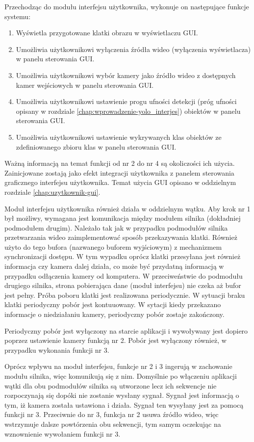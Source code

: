 Przechodząc do modułu interfejsu użytkownika, wykonuje on następujące funkcje systemu:
\begin{enumerate}
    \item Wyświetla przygotowane klatki obrazu w wyświetlaczu GUI.
    \item Umożliwia użytkownikowi wyłączenia źródła wideo (wyłączenia wyświetlacza) w panelu sterowania GUI.
    \item Umożliwia użytkownikowi wybór kamery jako źródło wideo z dostępnych kamer wejściowych w panelu sterowania GUI.
    \item Umożliwia użytkownikowi ustawienie progu ufności detekcji (próg ufności opisany w rozdziale \ref{chap:wprowadzenie-yolo_interjes}) obiektów w panelu sterowania GUI.
    \item Umożliwia użytkownikowi ustawienie wykrywanych klas obiektów ze zdefiniowanego zbioru klas w panelu sterowania GUI.
\end{enumerate}
Ważną informacją na temat funkcji od nr 2 do nr 4 są okoliczości ich użycia. Zainicjowane zostają jako efekt integracji użytkownika z panelem sterowania graficznego interfejsu użytkownika. Temat użycia GUI opisano w oddzielnym rozdziale \ref{chap:uzytkownik-gui}. 

Moduł interfejsu użytkownika również działa w oddzielnym wątku. Aby krok nr 1 był możliwy, wymagana jest komunikacja między modułem silnika (dokładniej podmodułem drugim).  
Należało tak jak w przypadku podmodułów silnika przetwarzania wideo zaimplementować sposób przekazywania klatki. Również użyto do tego bufora (nazwanego buforem wyjściowym) z mechanizmem synchronizacji dostępu. W tym wypadku oprócz klatki przesyłana jest również informacja czy kamera dalej działa, co może być przydatną informacją w przypadku odłączenia kamery od komputera. W przeciweństwie do podmodułu drugiego silnika, strona pobierająca dane (moduł interfejsu) nie czeka aż bufor jest pełny. Próba poboru klatki jest realizowana periodycznie. W sytuacji braku klatki periodyczny pobór jest kontuuowany. W sytacji kiedy przekazano informacje o niedziałaniu kamery, periodyczny pobór zostaje zakończony.

Periodyczny pobór jest wyłączony na starcie aplikacji i wywoływany jest dopiero poprzez ustawienie kamery funkcją nr 2. Pobór jest wyłączony również, w przypadku wykonania funkcji nr 3.

Oprócz wpływu na moduł interfejsu, funkcje nr 2 i 3 ingerują w zachowanie modułu silnika, więc komunikują się z nim. Domyślnie po włączeniu aplikacji wątki dla obu podmodułów silnika są utworzone lecz ich sekwencje nie rozpoczynają się dopóki nie zostanie wysłany sygnał. Sygnał jest informacją o tym, iż kamera została ustawiona i działa. Sygnał ten wysyłany jest za pomocą funkcji nr 3. Przeciwnie do nr 3, funkcja nr 2 usuwa źródło wideo, więc wstrzymuje dalsze powtórzenia obu sekwencji, tym samym oczekując na wznownienie wywołaniem funkcji nr 3.

